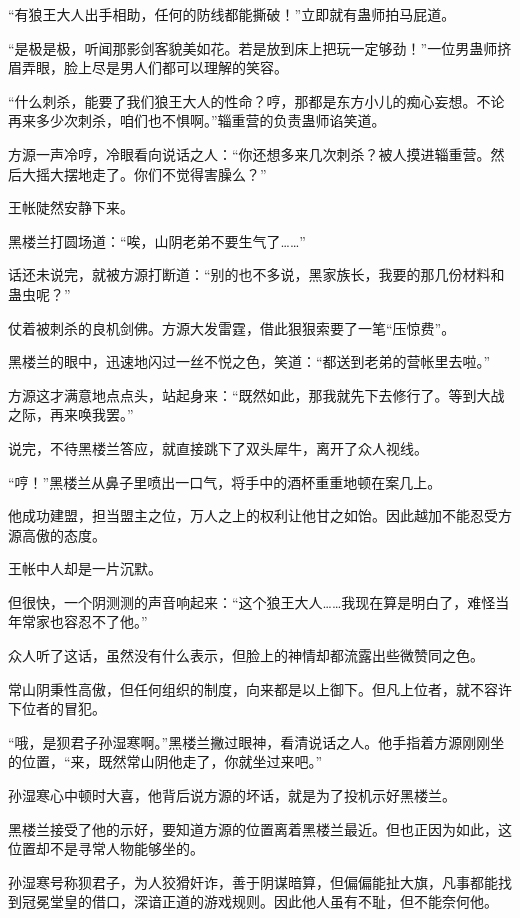 \begin{this_body}
“有狼王大人出手相助，任何的防线都能撕破！”立即就有蛊师拍马屁道。

“是极是极，听闻那影剑客貌美如花。若是放到床上把玩一定够劲！”一位男蛊师挤眉弄眼，脸上尽是男人们都可以理解的笑容。

“什么刺杀，能要了我们狼王大人的性命？哼，那都是东方小儿的痴心妄想。不论再来多少次刺杀，咱们也不惧啊。”辎重营的负责蛊师谄笑道。

方源一声冷哼，冷眼看向说话之人：“你还想多来几次刺杀？被人摸进辎重营。然后大摇大摆地走了。你们不觉得害臊么？”

王帐陡然安静下来。

黑楼兰打圆场道：“唉，山阴老弟不要生气了……”

话还未说完，就被方源打断道：“别的也不多说，黑家族长，我要的那几份材料和蛊虫呢？”

仗着被刺杀的良机剑佛。方源大发雷霆，借此狠狠索要了一笔“压惊费”。

黑楼兰的眼中，迅速地闪过一丝不悦之色，笑道：“都送到老弟的营帐里去啦。”

方源这才满意地点点头，站起身来：“既然如此，那我就先下去修行了。等到大战之际，再来唤我罢。”

说完，不待黑楼兰答应，就直接跳下了双头犀牛，离开了众人视线。

“哼！”黑楼兰从鼻子里喷出一口气，将手中的酒杯重重地顿在案几上。

他成功建盟，担当盟主之位，万人之上的权利让他甘之如饴。因此越加不能忍受方源高傲的态度。

王帐中人却是一片沉默。

但很快，一个阴测测的声音响起来：“这个狼王大人……我现在算是明白了，难怪当年常家也容忍不了他。”

众人听了这话，虽然没有什么表示，但脸上的神情却都流露出些微赞同之色。

常山阴秉性高傲，但任何组织的制度，向来都是以上御下。但凡上位者，就不容许下位者的冒犯。

“哦，是狈君子孙湿寒啊。”黑楼兰撇过眼神，看清说话之人。他手指着方源刚刚坐的位置，“来，既然常山阴他走了，你就坐过来吧。”

孙湿寒心中顿时大喜，他背后说方源的坏话，就是为了投机示好黑楼兰。

黑楼兰接受了他的示好，要知道方源的位置离着黑楼兰最近。但也正因为如此，这位置却不是寻常人物能够坐的。

孙湿寒号称狈君子，为人狡猾奸诈，善于阴谋暗算，但偏偏能扯大旗，凡事都能找到冠冕堂皇的借口，深谙正道的游戏规则。因此他人虽有不耻，但不能奈何他。


\end{this_body}
